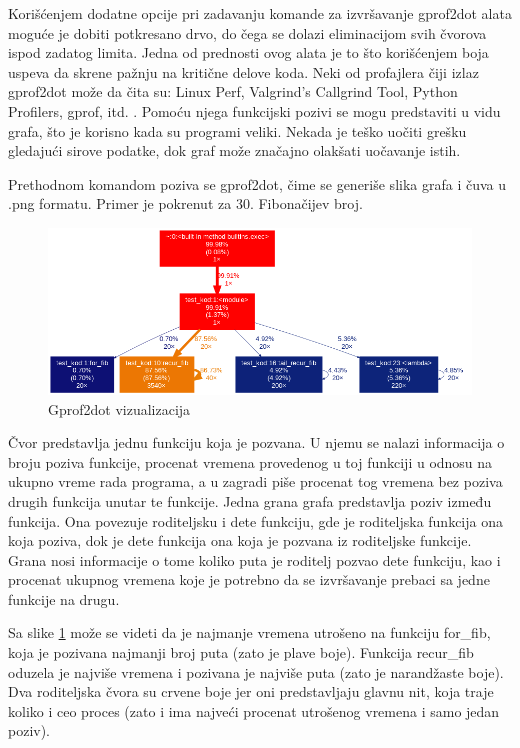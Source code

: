 \documentclass[a4paper]{article}
\begin{document}
Korišćenjem dodatne opcije pri zadavanju komande za izvršavanje gprof2dot alata moguće je dobiti potkresano drvo, do čega se dolazi eliminacijom svih čvorova ispod zadatog limita. Jedna od prednosti ovog alata je to što korišćenjem boja uspeva da skrene pažnju na kritične delove koda. Neki od profajlera čiji izlaz gprof2dot može da čita su: Linux Perf, Valgrind's Callgrind Tool, Python Profilers, gprof, itd. \cite{gprof}. Pomoću njega funkcijski pozivi se mogu predstaviti u vidu grafa, što je korisno kada su programi veliki. Nekada je teško uočiti grešku gledajući sirove podatke, dok graf može značajno olakšati uočavanje istih. 

Prethodnom komandom poziva se gprof2dot, čime se generiše slika grafa i čuva u .png formatu. Primer je pokrenut za 30. Fibonačijev broj.

\begin{figure}[h!]
\begin{center}
\includegraphics[scale=0.4]{gprof2dot.png}
\end{center}
\caption{Gprof2dot vizualizacija}
\label{fig:gprof2dot_1}
\end{figure}

Čvor predstavlja jednu funkciju koja je pozvana. U njemu se nalazi informacija o broju poziva funkcije, procenat vremena provedenog u toj funkciji u odnosu na ukupno vreme rada programa, a u zagradi piše procenat tog vremena bez poziva drugih funkcija unutar te funkcije. Jedna grana grafa predstavlja poziv između funkcija. Ona povezuje roditeljsku i dete funkciju, gde je roditeljska funkcija ona koja poziva, dok je dete funkcija ona koja je pozvana iz roditeljske funkcije. Grana nosi informacije o tome koliko puta je roditelj pozvao dete funkciju, kao i procenat ukupnog vremena koje je potrebno da se izvršavanje prebaci sa jedne funkcije na drugu.

Sa slike \ref{fig:gprof2dot_1} može se videti da je najmanje vremena utrošeno na funkciju for\_fib, koja je pozivana najmanji broj puta (zato je plave boje). Funkcija recur\_fib oduzela je najviše vremena i pozivana je najviše puta (zato je narandžaste boje). Dva roditeljska čvora su crvene boje jer oni predstavljaju glavnu nit, koja traje koliko i ceo proces (zato i ima najveći procenat utrošenog vremena i samo jedan poziv). 
\end{document}

